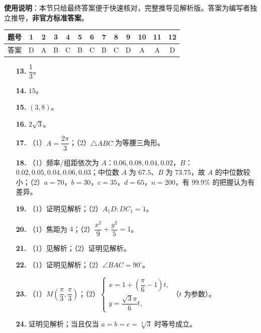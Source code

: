 
\begin{gknotice}
\textbf{使用说明}：本节只给最终答案便于快速核对，完整推导见解析版。答案为编写者独立推导，\textbf{非官方标准答案}。
\end{gknotice}

\begin{center}\begin{tabular}{ccccccccccccc}
\toprule
题号 & 1 & 2 & 3 & 4 & 5 & 6 & 7 & 8 & 9 & 10 & 11 & 12 \\
\midrule
答案 & D & A & B & C & B & C & B & C & D & A & A & D \\
\bottomrule
\end{tabular}\end{center}

\begin{itemize}[leftmargin=2.6em]
  \item[\textbf{13.}] $\dfrac13$。
  \item[\textbf{14.}] $15$。
  \item[\textbf{15.}] $(3,8)$。
  \item[\textbf{16.}] $2\sqrt3$。
\end{itemize}

\begin{itemize}[leftmargin=2.6em]
  \item[\textbf{17.}] （1）$A=\dfrac{2\pi}{3}$；（2）$\triangle ABC$ 为等腰三角形。
  \item[\textbf{18.}] （1）频率/组距依次为 $A$：$0.06,0.08,0.04,0.02$，$B$：$0.02,0.05,0.04,0.06,0.03$；中位数 $A$ 为 $67.5$、$B$ 为 $73.75$，故 $A$ 的中位数较小；（2）$a=70$，$b=30$，$c=35$，$d=65$，$n=200$，有 $99.9\%$ 的把握认为有差异。
  \item[\textbf{19.}] （1）证明见解析；（2）$A_1D:DC_1=1$。
  \item[\textbf{20.}] （1）焦距为 $4$；（2）$\dfrac{x^2}{9}+\dfrac{y^2}{5}=1$。
  \item[\textbf{21.}] （1）见解析；（2）证明见解析。
\end{itemize}

\begin{itemize}[leftmargin=2.6em]
  \item[\textbf{22.}] （1）证明见解析；（2）$\angle BAC=90^\circ$。
  \item[\textbf{23.}] （1）$M\left(\dfrac{\pi}{3},\dfrac{\pi}{3}\right)$；（2）$\begin{cases}x=1+\left(\dfrac{\pi}{6}-1\right)t,\\y=\dfrac{\sqrt3\pi}{6}t,\end{cases}$（$t$ 为参数）。
  \item[\textbf{24.}] 证明见解析；当且仅当 $a=b=c=\sqrt[4]{3}$ 时等号成立。
\end{itemize}
